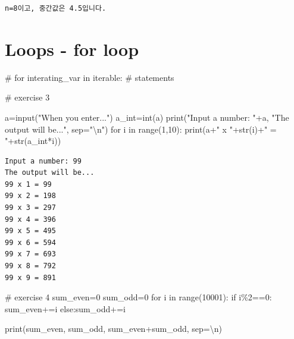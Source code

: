 \documentclass[
  a4paper,
  DIV=11,
  numbers=noendperiod]{scrreprt}
\newenvironment{Shaded}{\begin{snugshade}}{\end{snugshade}}
\newcommand{\BuiltInTok}[1]{\textcolor[rgb]{0.00,0.23,0.31}{#1}}
\newcommand{\CharTok}[1]{\textcolor[rgb]{0.13,0.47,0.30}{#1}}
\newcommand{\CommentTok}[1]{\textcolor[rgb]{0.37,0.37,0.37}{#1}}
\newcommand{\ControlFlowTok}[1]{\textcolor[rgb]{0.00,0.23,0.31}{#1}}
\newcommand{\DecValTok}[1]{\textcolor[rgb]{0.68,0.00,0.00}{#1}}
\newcommand{\KeywordTok}[1]{\textcolor[rgb]{0.00,0.23,0.31}{#1}}
\newcommand{\NormalTok}[1]{\textcolor[rgb]{0.00,0.23,0.31}{#1}}
\newcommand{\OperatorTok}[1]{\textcolor[rgb]{0.37,0.37,0.37}{#1}}
\newcommand{\StringTok}[1]{\textcolor[rgb]{0.13,0.47,0.30}{#1}}
\begin{document}
\begin{verbatim}
n=8이고, 중간값은 4.5입니다.
\end{verbatim}

\section{Loops - for loop}\label{loops---for-loop}

\begin{Shaded}
\begin{Highlighting}[]
\CommentTok{\# for interating\_var in iterable:}
\CommentTok{\#    statements}
\end{Highlighting}
\end{Shaded}

\begin{Shaded}
\begin{Highlighting}[]
\CommentTok{\# exercise 3}

\NormalTok{a}\OperatorTok{=}\BuiltInTok{input}\NormalTok{(}\StringTok{"When you enter..."}\NormalTok{)}
\NormalTok{a\_int}\OperatorTok{=}\BuiltInTok{int}\NormalTok{(a)}
\BuiltInTok{print}\NormalTok{(}\StringTok{"Input a number: "}\OperatorTok{+}\NormalTok{a,}
          \StringTok{"The output will be..."}\NormalTok{,}
\NormalTok{          sep}\OperatorTok{=}\StringTok{"}\CharTok{\textbackslash{}n}\StringTok{"}\NormalTok{)}
\ControlFlowTok{for}\NormalTok{ i }\KeywordTok{in} \BuiltInTok{range}\NormalTok{(}\DecValTok{1}\NormalTok{,}\DecValTok{10}\NormalTok{):}
    \BuiltInTok{print}\NormalTok{(a}\OperatorTok{+}\StringTok{" x "}\OperatorTok{+}\BuiltInTok{str}\NormalTok{(i)}\OperatorTok{+}\StringTok{" = "}\OperatorTok{+}\BuiltInTok{str}\NormalTok{(a\_int}\OperatorTok{*}\NormalTok{i))}
\end{Highlighting}
\end{Shaded}

\begin{verbatim}
Input a number: 99
The output will be...
99 x 1 = 99
99 x 2 = 198
99 x 3 = 297
99 x 4 = 396
99 x 5 = 495
99 x 6 = 594
99 x 7 = 693
99 x 8 = 792
99 x 9 = 891
\end{verbatim}

\begin{Shaded}
\begin{Highlighting}[]
\CommentTok{\# exercise 4}
\NormalTok{sum\_even}\OperatorTok{=}\DecValTok{0}
\NormalTok{sum\_odd}\OperatorTok{=}\DecValTok{0}
\ControlFlowTok{for}\NormalTok{ i }\KeywordTok{in} \BuiltInTok{range}\NormalTok{(}\DecValTok{10001}\NormalTok{):}
    \ControlFlowTok{if}\NormalTok{ i}\OperatorTok{\%}\DecValTok{2}\OperatorTok{==}\DecValTok{0}\NormalTok{:}
\NormalTok{        sum\_even}\OperatorTok{+=}\NormalTok{i}
    \ControlFlowTok{else}\NormalTok{:sum\_odd}\OperatorTok{+=}\NormalTok{i}

\BuiltInTok{print}\NormalTok{(sum\_even,}
\NormalTok{      sum\_odd,}
\NormalTok{      sum\_even}\OperatorTok{+}\NormalTok{sum\_odd,}
\NormalTok{      sep}\OperatorTok{=}\StringTok{\textquotesingle{}}\CharTok{\textbackslash{}n}\StringTok{\textquotesingle{}}\NormalTok{)}
\end{Highlighting}
\end{Shaded}
\end{document}
